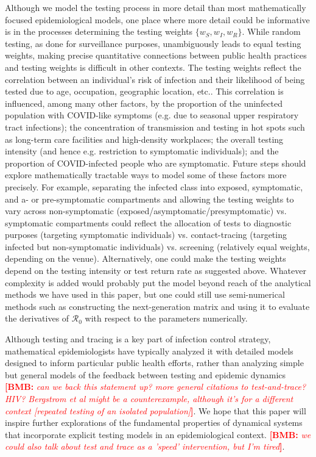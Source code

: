 \documentclass[12pt]{article}
\newcommand{\Rnum}{\ensuremath{\mathcal{R}_0}\xspace}
\DeclareRobustCommand\_{\ifmmode\expandafter\subtxt\else\textunderscore\fi}
\newcommand{\comment}{\showcomment}
\newcommand{\showcomment}[3]{\textcolor{#1}{\textbf{[#2: }\textsl{#3}\textbf{]}}}
\newcommand{\bmb}[1]{\comment{red}{BMB}{#1}}
\theoremstyle{definition} %
\begin{document}
Although we model the testing process in more detail than most mathematically focused epidemiological models, one place where more detail could be informative is in the processes determining the testing weights $\{w_S, w_I, w_R\}$. While random testing, as done for surveillance purposes, unambiguously leads to equal testing weights, making precise quantitative connections between public health practices and testing weights is difficult in other contexts. The testing weights reflect the correlation between an individual's risk of infection and their likelihood of being tested due to age, occupation, geographic location, etc.. This correlation is influenced, among many other factors, by the proportion of the uninfected population with COVID-like symptoms (e.g. due to seasonal upper respiratory tract infections); the concentration of transmission and testing in hot spots such as long-term care facilities and high-density workplaces; the overall testing intensity (and hence e.g. restriction to symptomatic individuals); and the proportion of COVID-infected people who are symptomatic. Future steps should explore mathematically tractable ways to model some of these factors more precisely. For example, separating the infected class into exposed, symptomatic, and a- or pre-symptomatic compartments and allowing the testing weights to vary across non-symptomatic (exposed/asymptomatic/presymptomatic) vs. symptomatic compartments could reflect the allocation of tests to diagnostic purposes (targeting symptomatic individuals) vs. contact-tracing (targeting infected but non-symptomatic individuals) vs. screening (relatively equal weights, depending on the venue). Alternatively, one could make the testing weights depend on the testing intensity or test return rate as suggested above. Whatever complexity is added would probably put the model beyond reach of the analytical methods we have used in this paper, but one could still use semi-numerical methods such as constructing the next-generation matrix and using it to evaluate the derivatives of $\Rnum$ with respect to the parameters numerically.

Although testing and tracing is a key part of infection control strategy, mathematical epidemiologists have typically analyzed it with detailed models designed to inform particular public health efforts, rather than analyzing simple but general models of the feedback between testing and epidemic dynamics \bmb{can we back this statement up? more general citations to test-and-trace? HIV? Bergstrom et al might be a counterexample, although it's for a different context [repeated testing of an isolated population]}. We hope that this paper will inspire further explorations of the fundamental properties of dynamical systems that incorporate explicit testing models in an epidemiological context. \bmb{we could also talk about test and trace as a 'speed' intervention, but I'm tired}.
\end{document}

